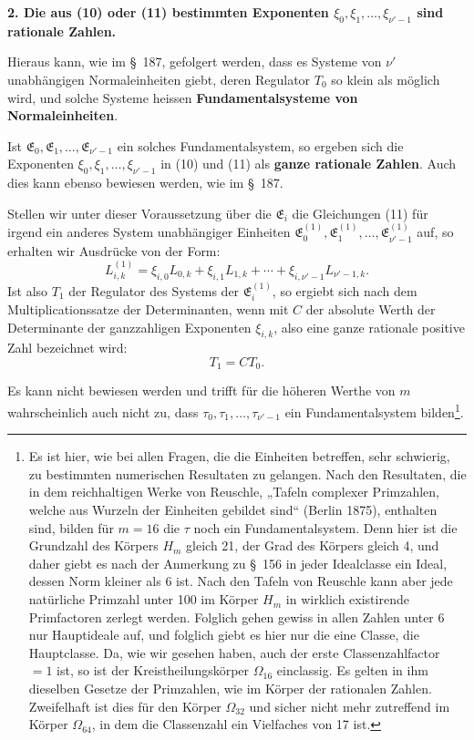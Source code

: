 \documentclass[11pt]{article}
\begin{document}
\begin{center}\textbf{2. Die aus (10) oder (11) bestimmten Exponenten $\xi_0,\xi_1,\ldots,\xi_{\nu'-1}$ sind rationale Zahlen.}\end{center}

Hieraus kann, wie im \S~187, gefolgert werden, dass es Systeme von $\nu'$ unabhängigen Normaleinheiten giebt, deren Regulator $T_0$ so klein als möglich wird, und solche Systeme heissen \textbf{Fundamentalsysteme von Normaleinheiten}.

Ist $\mathfrak E_0,\mathfrak E_1,\ldots,\mathfrak E_{\nu'-1}$ ein solches Fundamentalsystem, so ergeben sich die Exponenten $\xi_0,\xi_1,\ldots,\xi_{\nu'-1}$ in (10) und (11) als \textbf{ganze rationale Zahlen}. Auch dies kann ebenso bewiesen werden, wie im \S~187.

Stellen wir unter dieser Voraussetzung über die $\mathfrak E_i$ die Gleichungen (11) für irgend ein anderes System unabhängiger Einheiten $\mathfrak E_0^{(1)},\mathfrak E_1^{(1)},\ldots,\mathfrak E_{\nu'-1}^{(1)}$ auf, so erhalten wir Ausdrücke von der Form:
\[
L_{i,k}^{(1)}=\xi_{i,0}L_{0,k}+\xi_{i,1}L_{1,k}+\cdots+\xi_{i,\nu'-1}L_{\nu'-1,k}.
\]
Ist also $T_1$ der Regulator des Systems der $\mathfrak E_i^{(1)}$, so ergiebt sich nach dem Multiplicationssatze der Determinanten, wenn mit $C$ der absolute Werth der Determinante der ganzzahligen Exponenten $\xi_{i,k}$, also eine ganze rationale positive Zahl bezeichnet wird:
\begin{equation}
T_1=CT_0.
\tag{13}
\end{equation}

Es kann nicht bewiesen werden und trifft für die höheren Werthe von $m$ wahrscheinlich auch nicht zu, dass $\tau_0,\tau_1,\ldots,\tau_{\nu'-1}$ ein Fundamentalsystem bilden\footnote{Es ist hier, wie bei allen Fragen, die die Einheiten betreffen, sehr schwierig, zu bestimmten numerischen Resultaten zu gelangen. Nach den Resultaten, die in dem reichhaltigen Werke von Reuschle, „Tafeln complexer Primzahlen, welche aus Wurzeln der Einheiten gebildet sind“ (Berlin 1875), enthalten sind, bilden für $m=16$ die $\tau$ noch ein Fundamentalsystem. Denn hier ist die Grundzahl des Körpers $H_m$ gleich 21, der Grad des Körpers gleich 4, und daher giebt es nach der Anmerkung zu \S~156 in jeder Idealclasse ein Ideal, dessen Norm kleiner als 6 ist. Nach den Tafeln von Reuschle kann aber jede natürliche Primzahl unter 100 im Körper $H_m$ in wirklich existirende Primfactoren zerlegt werden. Folglich gehen gewiss in allen Zahlen unter 6 nur Hauptideale auf, und folglich giebt es hier nur die eine Classe, die Hauptclasse. Da, wie wir gesehen haben, auch der erste Classenzahlfactor $=1$ ist, so ist der Kreistheilungskörper $\Omega_{16}$ einclassig. Es gelten in ihm dieselben Gesetze der Primzahlen, wie im Körper der rationalen Zahlen. Zweifelhaft ist dies für den Körper $\Omega_{32}$ und sicher nicht mehr zutreffend im Körper $\Omega_{64}$, in dem die Classenzahl ein Vielfaches von 17 ist.}.
\end{document}
